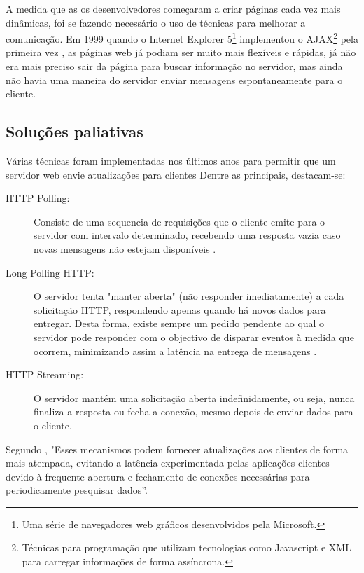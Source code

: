 A medida que as os desenvolvedores começaram a criar páginas cada vez mais dinâmicas, foi se fazendo necessário o uso de técnicas para melhorar a comunicação. Em 1999 quando o Internet Explorer 5\footnote{Uma série de navegadores web gráficos desenvolvidos pela Microsoft.} implementou o AJAX\footnote{Técnicas para programação que utilizam tecnologias como Javascript e XML para carregar informações de forma assíncrona.} pela primeira vez \cite{Asleson2006}, as páginas web já podiam ser muito mais flexíveis e rápidas, já não era mais preciso sair da página para buscar informação no servidor, mas ainda não havia uma maneira do servidor enviar mensagens espontaneamente para o cliente.

\subsection{Soluções paliativas}

Várias técnicas foram implementadas nos últimos anos para permitir que um servidor web envie atualizações para clientes Dentre as principais, destacam-se:

\begin{description}
	\item[HTTP Polling:] Consiste de uma sequencia de requisições que o cliente emite para o servidor com intervalo determinado, recebendo uma resposta vazia caso novas mensagens não estejam disponíveis \cite{Pimentel2012}.

	\item[Long Polling HTTP:] O servidor tenta "manter aberta" (não responder imediatamente) a cada solicitação HTTP, respondendo apenas quando há novos dados para entregar. Desta forma, existe sempre um pedido pendente ao qual o servidor pode responder com o objectivo de disparar eventos à medida que ocorrem, minimizando assim a latência na entrega de mensagens \cite{Aghaei2012}.

	\item[HTTP Streaming:] O servidor mantém uma solicitação aberta indefinidamente, ou seja, nunca finaliza a resposta ou fecha a conexão, mesmo depois de enviar dados para o cliente.
\end{description}

Segundo , "Esses mecanismos podem fornecer atualizações aos clientes de forma mais atempada, evitando a latência experimentada pelas aplicações clientes devido à frequente abertura e fechamento de conexões necessárias para periodicamente pesquisar dados”.

